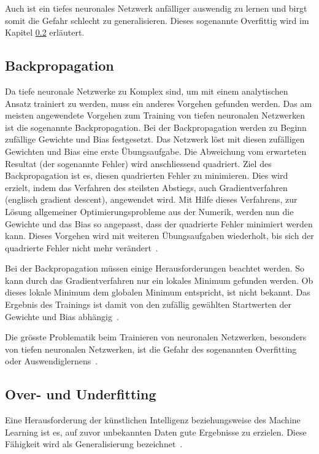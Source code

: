 Auch ist ein tiefes neuronales Netzwerk anfälliger auswendig zu lernen und birgt somit die Gefahr schlecht zu generalisieren. Dieses sogenannte Overfittig wird im Kapitel \ref{chap:overfitting} erläutert.

\subsection{Backpropagation}
\label{chap:backpropagation}

Da tiefe neuronale Netzwerke zu Komplex sind, um mit einem analytischen Ansatz trainiert zu werden, muss ein anderes Vorgehen gefunden werden. Das am meisten angewendete Vorgehen zum Training von tiefen neuronalen Netzwerken ist die sogenannte Backpropagation. Bei der Backpropagation werden zu Beginn zufällige Gewichte und Bias festgesetzt. Das Netzwerk löst mit diesen zufälligen Gewichten und Bias eine erste Übungsaufgabe. Die Abweichung vom erwarteten Resultat (der sogenannte Fehler) wird anschliessend quadriert. Ziel des Backpropagation ist es, diesen quadrierten Fehler zu minimieren. Dies wird erzielt, indem das Verfahren des steilsten Abstiegs, auch Gradientverfahren (englisch gradient descent), angewendet wird. Mit Hilfe dieses Verfahrens, zur Lösung allgemeiner Optimierungsprobleme aus der Numerik, werden nun die Gewichte und das Bias so angepasst, dass der quadrierte Fehler minimiert werden kann. Dieses Vorgehen wird mit weiteren Übungsaufgaben wiederholt, bis sich der quadrierte Fehler nicht mehr verändert~\autocite{Krogh2008}.

Bei der Backpropagation müssen einige Herausforderungen beachtet werden. So kann durch das Gradientverfahren nur ein lokales Minimum gefunden werden. Ob dieses lokale Minimum dem globalen Minimum entspricht, ist nicht bekannt. Das Ergebnis des Trainings ist damit von den zufällig gewählten Startwerten der Gewichte und Bias abhängig~\autocite{Krogh2008}.

Die grösste Problematik beim Trainieren von neuronalen Netzwerken, besonders von tiefen neuronalen Netzwerken, ist die Gefahr des sogenannten Overfitting oder Auswendiglernens~\autocite{Krogh2008}.

\subsection{Over- und Underfitting}
\label{chap:overfitting}

Eine Herausforderung der künstlichen Intelligenz beziehungsweise des Machine Learning ist es, auf zuvor unbekannten Daten gute Ergebnisse zu erzielen. Diese Fähigkeit wird als Generalisierung bezeichnet~\autocite{Goodfellow2016}.

